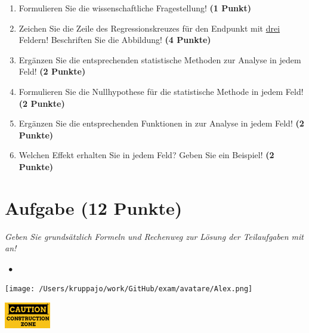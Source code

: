 \documentclass[a4paper, 9pt]{scrartcl}\usepackage[]{graphicx}\usepackage[]{xcolor}
\begin{document}
\begin{enumerate}
  \item Formulieren Sie die wissenschaftliche Fragestellung! \textbf{(1 Punkt)}
\item Zeichen Sie die Zeile des Regressionskreuzes für den Endpunkt mit \underline{drei} Feldern! Beschriften Sie die Abbildung! \textbf{(4 Punkte)}
\item Ergänzen Sie die entsprechenden statistische Methoden zur Analyse in jedem Feld! \textbf{(2 Punkte)}
\item Formulieren Sie die Nullhypothese für die statistische Methode in jedem Feld! \textbf{(2 Punkte)}
\item Ergänzen Sie die entsprechenden Funktionen in \Rlogo zur Analyse in jedem Feld! \textbf{(2 Punkte)}
\item Welchen Effekt erhalten Sie in jedem Feld? Geben Sie ein Beispiel! \textbf{(2 Punkte)}
\end{enumerate} 
\clearpage

\section{Aufgabe \hfill (12 Punkte)}

\textit{Geben Sie grundsätzlich Formeln und Rechenweg zur Lösung der Teilaufgaben mit an!} \\[1Ex]
 

 
\ifcollection
\begin{flushright}
\tiny\vspace{-3Ex}
\textbf{\examinhaltstart}
\exammodulelanddaten $\;\bullet$
\exammodulebiostat
\vspace{-4Ex}
\end{flushright}
\begin{minipage}[t]{0.5\textwidth}
\texttt{[image: /Users/kruppajo/work/GitHub/exam/avatare/Alex.png]}
\end{minipage}
\begin{minipage}[t]{0.5\textwidth}
\hfill
\href{https://youtu.be/C9skfFRTHhI}{\includegraphics[width = 2cm]{img/caution}}
\end{minipage}
\vspace{-3ex}
\fi
\end{document}
